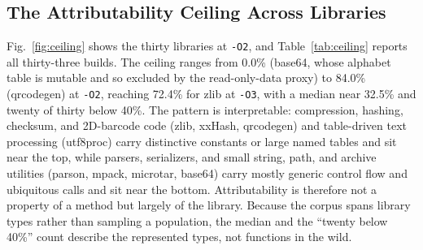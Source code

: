 \documentclass[conference]{IEEEtran}
\begin{document}
\subsection{The Attributability Ceiling Across Libraries}
Fig.~\ref{fig:ceiling} shows the thirty libraries at \texttt{-O2}, and
Table~\ref{tab:ceiling} reports all thirty-three builds. The ceiling ranges from 0.0\%
(base64, whose alphabet table is mutable and so excluded by the read-only-data proxy) to
84.0\% (qrcodegen) at \texttt{-O2}, reaching 72.4\%
for zlib at \texttt{-O3}, with a median near 32.5\% and twenty of thirty below 40\%. The
pattern is interpretable: compression, hashing, checksum, and 2D-barcode code (zlib,
xxHash, qrcodegen) and table-driven text processing (utf8proc) carry distinctive
constants or large named tables and sit near the top, while parsers, serializers, and
small string, path, and archive utilities (parson, mpack, microtar, base64) carry mostly
generic control flow and ubiquitous calls and sit near the bottom. Attributability is
therefore not a property of a method but largely of the library. Because the corpus
spans library types rather than sampling a population, the median and the ``twenty below
40\%'' count describe the represented types, not functions in the wild.
\end{document}
